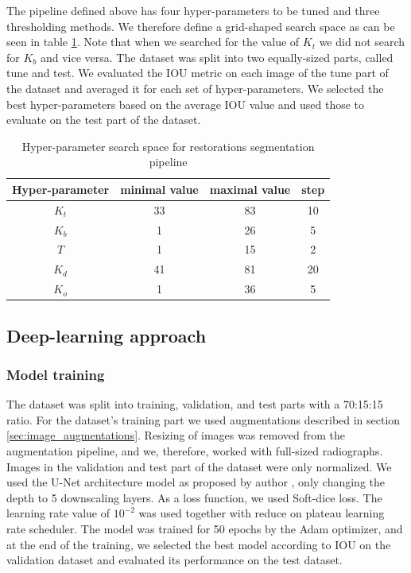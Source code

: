The pipeline defined above has four hyper-parameters to be tuned and three thresholding methods. We therefore define a grid-shaped search space as can be seen in table \ref{tab:hyper_param_segmentation}. Note that when we searched for the value of $K_t$ we did not search for $K_b$ and vice versa.
The dataset was split into two equally-sized parts, called tune and test. We evaluated the IOU metric on each image of the tune part of the dataset and averaged it for each set of hyper-parameters. We selected the best hyper-parameters based on the average IOU value and used those to evaluate on the test part of the dataset.

\begin{table}
    \begin{tabular}{|c|c|c|c|}
        \hline
        Hyper-parameter & minimal value & maximal value & step \\ \hline
        $K_t$           & 33            & 83            & 10   \\ \hline
        $K_b$           & 1             & 26            & 5    \\ \hline
        $T$             & 1             & 15            & 2    \\ \hline
        $K_d$           & 41            & 81            & 20   \\ \hline
        $K_o$           & 1             & 36            & 5    \\ \hline
    \end{tabular}
    \caption{Hyper-parameter search space for restorations segmentation pipeline}
    \label{tab:hyper_param_segmentation}
\end{table}

\subsection{Deep-learning approach}
\label{sec:methods:seg_unet}
\subsubsection{Model training}
The dataset was split into training, validation, and test parts with a 70:15:15 ratio. For the dataset's training part we used augmentations described in section \ref{sec:image_augmentations}. Resizing of images was removed from the augmentation pipeline, and we, therefore, worked with full-sized radiographs. Images in the validation and test part of the dataset were only normalized.
We used the U-Net architecture model as proposed by author \cite{Ronneberger2015}, only changing the depth to 5 downscaling layers. As a loss function, we used Soft-dice loss. The learning rate value of $10^{-2}$ was used together with reduce on plateau learning rate scheduler. The model was trained for 50 epochs by the Adam optimizer, and at the end of the training, we selected the best model according to IOU on the validation dataset and evaluated its performance on the test dataset.

